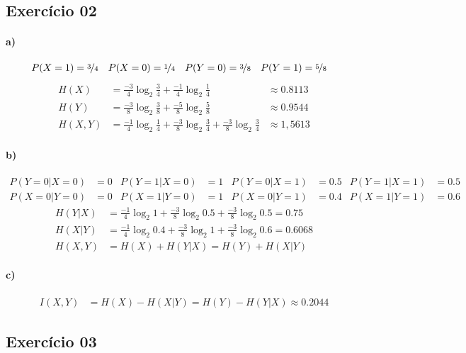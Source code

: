 \documentclass{article}
\begin{document}
    \subsection*{Exercício 02}
    \paragraph{a)}
    \begin{align*}
        P(X=1)&=\nicefrac{3}{4}&
        P(X=0)&=\nicefrac{1}{4}&
        P(Y=0)&=\nicefrac{3}{8}&
        P(Y=1)&=\nicefrac{5}{8}
    \end{align*}
    \begin{align*}
        H(X)&=\frac{-3}{4}\log_{2}\frac{3}{4} + \frac{-1}{4}\log_{2}\frac{1}{4} 
        &\approx 0.8113\\
        H(Y)&=\frac{-3}{8}\log_{2}\frac{3}{8} +\frac{-5}{8}\log_{2}\frac{5}{8} 
        &\approx 0.9544\\
        H(X,Y)&=\frac{-1}{4}\log_{2}\frac{1}{4} + 
                \frac{-3}{8}\log_{2}\frac{3}{4} +
                \frac{-3}{8}\log_{2}\frac{3}{4}
                &\approx 1,5613
    \end{align*}
    \paragraph{b)}
    \begin{align*}
       P(Y=0|X=0)&=0 & P(Y=1|X=0)&=1 & P(Y=0|X=1)&=0.5 & P(Y=1|X=1)&=0.5 \\
       P(X=0|Y=0)&=0 & P(X=1|Y=0)&=1 & P(X=0|Y=1)&=0.4 & P(X=1|Y=1)&=0.6 
    \end{align*}
    \begin{align*}
        H(Y|X)&=\frac{-1}{4}\log_{2}1 + \frac{-3}{8}\log_{2}0.5 + \frac{-3}{8}\log_{2}0.5=0.75 \\ 
        H(X|Y)&=\frac{-1}{4}\log_{2}0.4 + \frac{-3}{8}\log_{2}1 + \frac{-3}{8}\log_{2}0.6=0.6068\\
        H(X,Y)&=H(X) + H(Y|X)=H(Y) + H(X|Y) 
    \end{align*}
    \paragraph{c)}
    \begin{align*}
        I(X,Y)&=H(X)-H(X|Y)=H(Y)-H(Y|X)\approx 0.2044  
    \end{align*}
    \subsection*{Exercício 03}
\end{document}
